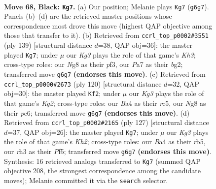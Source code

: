 \documentclass[11pt]{article}
\begin{document}
\clearpage

\begin{figure}[p]\centering
\begin{subfigure}{0.46\textwidth}\centering
\resizebox{\linewidth}{!}{%
\newchessgame
\chessboard[
  setfen={1R4n1/p7/P5kp/1P3p2/b4P2/7R/3r4/4b1K1 b - - 6 68},
  showmover=false,
  pgfstyle=straightmove, color=movearrow, markmove={g6-g7}
]}
\caption{}
\end{subfigure}\hfill
\begin{subfigure}{0.46\textwidth}\centering
\resizebox{\linewidth}{!}{%
\newchessgame
\chessboard[
  setfen={8/8/6pk/3R3p/7P/4rPP1/5bBK/8 b - - 13 70},
  showmover=false,
  pgfstyle=straightmove, color=movearrow, markmove={h6-g7}
]}
\caption{}
\end{subfigure}
\\[4pt]
\begin{subfigure}{0.46\textwidth}\centering
\resizebox{\linewidth}{!}{%
\newchessgame
\chessboard[
  setfen={8/8/3ppkp1/2r5/p1P1R3/P5P1/6K1/1B6 w - - 2 61},
  showmover=false,
  pgfstyle=straightmove, color=movearrow, markmove={g2-f2}
]}
\caption{}
\end{subfigure}\hfill
\begin{subfigure}{0.46\textwidth}\centering
\resizebox{\linewidth}{!}{%
\newchessgame
\chessboard[
  setfen={8/7k/4P1p1/pR3p2/P4P1p/4P2r/1P3K2/8 b - - 0 64},
  showmover=false,
  pgfstyle=straightmove, color=movearrow, markmove={h7-g7}
]}
\caption{}
\end{subfigure}
\caption{\textbf{Move 68, Black: \texttt{Kg7}.} (a) Our position; Melanie plays \texttt{Kg7} (\texttt{g6g7}). Panels (b)--(d) are the retrieved master positions whose correspondence most drove this move (highest QAP objective among those that transfer to it). (b) Retrieved from \texttt{ccrl\_top\_p0002\#3551} (ply 139) [structural distance $d$=38, QAP obj=36]: the master played \texttt{Kg7}; under $\mu$ our \emph{Kg3} plays the role of that game's \emph{Kh3}; cross-type roles: our \emph{N}g8 as their \emph{p}f3, our \emph{P}a7 as their \emph{b}g2; transferred move \texttt{g6g7} \textbf{(endorses this move)}. (c) Retrieved from \texttt{ccrl\_top\_p0000\#2673} (ply 120) [structural distance $d$=32, QAP obj=30]: the master played \texttt{Kf2}; under $\mu$ our \emph{Kg3} plays the role of that game's \emph{Kg2}; cross-type roles: our \emph{B}a4 as their \emph{r}c5, our \emph{N}g8 as their \emph{p}e6; transferred move \texttt{g6g7} \textbf{(endorses this move)}. (d) Retrieved from \texttt{ccrl\_top\_p0002\#2165} (ply 127) [structural distance $d$=37, QAP obj=26]: the master played \texttt{Kg7}; under $\mu$ our \emph{Kg3} plays the role of that game's \emph{Kh2}; cross-type roles: our \emph{B}a4 as their \emph{r}b5, our \emph{r}h3 as their \emph{P}f5; transferred move \texttt{g6g7} \textbf{(endorses this move)}. Synthesis: 16 retrieved analogs transferred to \texttt{Kg7} (summed QAP objective 208, the strongest correspondence among the candidate moves); Melanie committed it via the \texttt{search} selector.}
\label{fig:thought-m135}
\end{figure}
\end{document}
